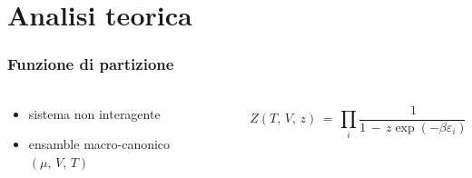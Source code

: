 \section{Analisi teorica}


\begin{frame}
  \frametitle{Funzione di partizione}
  \framesubtitle{}

  \begin{columns}
    \begin{column}{0.4\textwidth}
      \begin{itemize}[itemsep=0.5em, label=$\bullet$]
        \item sistema non interagente
        \item ensamble macro-canonico $\left(\mu,\,V,\,T\right)$
      \end{itemize}
    \end{column}
    
    \begin{column}{0.6\textwidth}

      $$
      Z\left(T,\,V,\,z\right)\,=\,\prod_i \frac{1}{1\,-\,z\exp{\left(-\beta \varepsilon_i \right)}}
      $$
      
    \end{column}
  \end{columns}

\end{frame}



